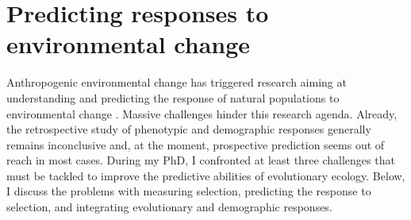 \section{Predicting responses to environmental change}
Anthropogenic environmental change has triggered research aiming at understanding and predicting the response of natural populations to environmental change \parencite{parmesan2006, Chevin2012, Smallegange2013, Charmantier2014climate}.
Massive challenges hinder this research agenda. Already, the retrospective study of phenotypic and demographic responses generally remains inconclusive \parencite{Merila2001,McCarty2001, Charmantier2014climate, Brookfield2016} and, at the moment, prospective prediction seems out of reach in most cases. 
During my PhD, I confronted at least three challenges that must be tackled to improve the predictive abilities of evolutionary ecology. Below, I discuss the problems with measuring selection, predicting the response to selection, and integrating evolutionary and demographic responses.

